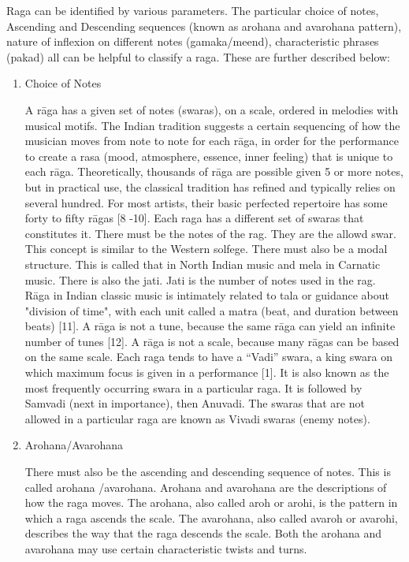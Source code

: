 \doublespacing
\setlength{\parindent}{1cm}

\par

Raga can be identified by various parameters. The particular choice of notes, Ascending and Descending sequences (known as arohana and avarohana pattern), nature of inflexion on different notes (gamaka/meend), characteristic phrases (pakad) all can be helpful to classify a raga. These are further described below:

\begin{enumerate}
  \item Choice of Notes \par
  A rāga has a given set of notes (swaras), on a scale, ordered in melodies with musical motifs. The Indian tradition suggests a certain sequencing of how the musician moves from note to note for each rāga, in order for the performance to create a rasa (mood, atmosphere, essence, inner feeling) that is unique to each rāga. Theoretically, thousands of rāga are possible given 5 or more notes, but in practical use, the classical tradition has refined and typically relies on several hundred. For most artists, their basic perfected repertoire has some forty to fifty rāgas [8 -10]. Each raga has a different set of swaras that constitutes it. There must be the notes of the rag.  They are the allowd swar.  This concept is similar to the Western solfege. There must also be a modal structure.  This is called that in North Indian music and mela in Carnatic music. There is also the jati.  Jati is the number of notes used in the rag. Rāga in Indian classic music is intimately related to tala or guidance about "division of time", with each unit called a matra (beat, and duration between beats) [11]. A rāga is not a tune, because the same rāga can yield an infinite number of tunes [12].  A rāga is not a scale, because many rāgas can be based on the same scale. Each raga tends to have  a “Vadi” swara, a king swara on which maximum focus is given in a performance [1].  It is also known as the most frequently occurring swara in a particular raga. It is followed by Samvadi (next in importance), then Anuvadi.  The swaras that are not allowed in a particular raga are known as Vivadi swaras (enemy notes).
  \par
  \item Arohana/Avarohana \par
  There must also be the ascending and descending sequence of notes.  This is called arohana /avarohana. Arohana and avarohana are the descriptions of how the raga moves.  The arohana, also called aroh or arohi, is the pattern in which a raga ascends the scale.  The avarohana, also called avaroh or avarohi, describes the way that the raga descends the scale.  Both the arohana and avarohana may use certain characteristic twists and turns.

\end{enumerate}
